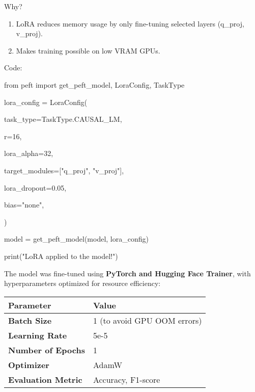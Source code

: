 \documentclass{article} %
\begin{document}
\noindent \begin{flushleft}
Why?
\end{flushleft}

\begin{enumerate}
\item  LoRA reduces memory usage by only fine-tuning selected layers (q\_proj, v\_proj).

\item  Makes training possible on low VRAM GPUs.
\end{enumerate}

\noindent \begin{flushleft}
Code:

\noindent from peft import get\_peft\_model, LoraConfig, TaskType

\noindent lora\_config = LoraConfig(

\noindent     task\_type=TaskType.CAUSAL\_LM,

\noindent     r=16,

\noindent     lora\_alpha=32,

\noindent     target\_modules=["q\_proj", "v\_proj"],

\noindent     lora\_dropout=0.05,

\noindent     bias="none",

\noindent )

\noindent model = get\_peft\_model(model, lora\_config)

\noindent print("LoRA applied to the model!")

\noindent 
\newline

\noindent \textbf{}
\newline

\noindent The model was fine-tuned using \textbf{PyTorch and Hugging Face Trainer}, with hyperparameters optimized for resource efficiency:
\end{flushleft}

\begin{tabular}{|p{1.0in}|p{1.4in}|} \hline 
\textbf{Parameter} & \textbf{Value} \\ \hline 
\textbf{Batch Size} & 1 (to avoid GPU OOM errors) \\ \hline 
\textbf{Learning Rate} & 5e-5 \\ \hline 
\textbf{Number of Epochs} & 1 \\ \hline 
\textbf{Optimizer} & AdamW \\ \hline 
\textbf{Evaluation Metric} & Accuracy, F1-score \\ \hline 
\end{tabular}
\end{document}
